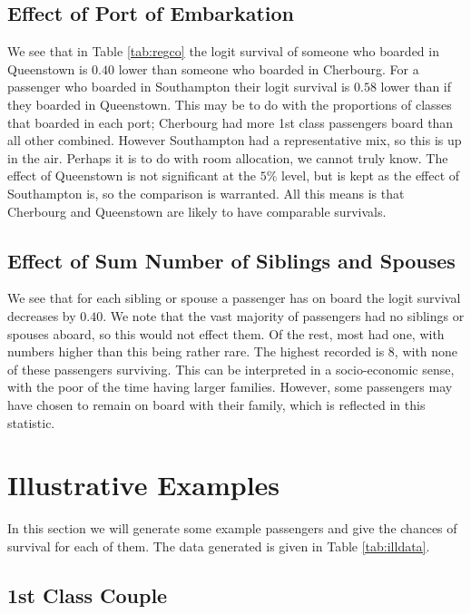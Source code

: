 \documentclass[]{extarticle}
\begin{document}
\subsection{Effect of Port of Embarkation}

We see that in Table \ref{tab:regco} the logit survival of someone who boarded in Queenstown is $0.40$ lower than someone who boarded in Cherbourg. For a passenger who boarded in Southampton their logit survival is $0.58$ lower than if they boarded in Queenstown. This may be to do with the proportions of classes that boarded in each port; Cherbourg had more 1st class passengers board than all other combined. However Southampton had a representative mix, so this is up in the air. Perhaps it is to do with room allocation, we cannot truly know. The effect of Queenstown is not significant at the $5\%$ level, but is kept as the effect of Southampton is, so the comparison is warranted. All this means is that Cherbourg and Queenstown are likely to have comparable survivals.

\subsection{Effect of Sum Number of Siblings and Spouses}

We see that for each sibling or spouse a passenger has on board the logit survival decreases by $0.40$. We note that the vast majority of passengers had no siblings or spouses aboard, so this would not effect them. Of the rest, most had one, with numbers higher than this being rather rare. The highest recorded is 8, with none of these passengers surviving. This can be interpreted in a socio-economic sense, with the poor of the time having larger families. However, some passengers may have chosen to remain on board with their family, which is reflected in this statistic.

\section{Illustrative Examples}

In this section we will generate some example passengers and give the chances of survival for each of them. The data generated is given in Table \ref{tab:illdata}.

\subsection{1st Class Couple}
\end{document}
